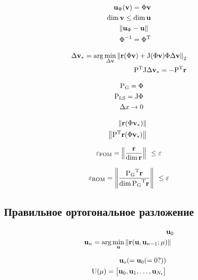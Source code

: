 \begin{align}
    \unk_\Phi (\vunk) = \Phi \vunk \\
    \dim{\vunk} \leq \dim{\unk} \\
    \norm{\unk_\Phi - \unk} \\
    \Phi^{-1} = \transpose{\Phi}
\end{align}

\begin{align}
    \dvunk_\ast = \arg \min_{\dvunk} \norm[2]{\resid(\Phi \vunk) + \jac(\Phi \vunk) \Phi \dvunk} \\
    \transpose{P}\jac \dvunk_\ast = - \transpose{P} \resid
\end{align}

\begin{align}
    \matr{P}_\text{G} = \Phi \\
    \matr{P}_\text{LS} = \jac \Phi \\
    \Delta x \rightarrow 0
\end{align}

\begin{align}
    \norm{\resid(\Phi \vunk_\ast)} \\
    \norm{\transpose{P}\resid(\Phi \vunk_\ast)}
\end{align}

\begin{equation}
    \varepsilon_\text{FOM} = \left\| \frac{\mathbf{r}}{\dim{\mathbf{r}}} \right\|_{~} \leq \varepsilon \\
\end{equation}

\begin{equation}
    \varepsilon_\text{ROM} = \norm{\frac{\transpose{\matr{P}_\text{G}}\resid}{\dim{ \transpose{\matr{P}_\text{G}}\resid}}} \leq \varepsilon
\end{equation}

\subsection{Правильное ортогональное разложение}

\begin{align}
    \mathbf{u}_0 \\
    \mathbf{u}_n = \arg \min_{\mathbf{u}} \left\| \mathbf{r}(\mathbf{u},\mathbf{u}_{n-1};\mathbf{\mu}) \right\|_{~}
\end{align}

\begin{align}
    \unk_\text{o} (= \unk_0 (= 0 ?)) \\
    \matr{U} (\param) =
    \begin{bmatrix}
        \unk_0, \unk_1, \dots, \unk_{N_t}
    \end{bmatrix}
\end{align}

